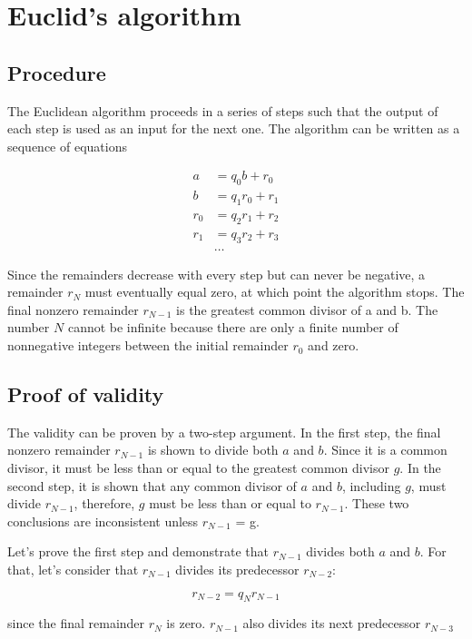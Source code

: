 \section*{Euclid's algorithm}

\subsection*{Procedure}

The Euclidean algorithm proceeds in a series of steps such that the output of each step is used as an input for the next one. The algorithm can be written as a sequence of equations

\begin{align*}
a &= q_0 b + r_0\\
b &= q_1 r_0 + r_1\\
r_0 &= q_2 r_1 + r_2\\
r_1 &= q_3 r_2 + r_3\\
&\dots
\end{align*}

Since the remainders decrease with every step but can never be negative, a remainder $r_N$ must eventually equal zero, at which point the algorithm stops. The final nonzero remainder $r_{N-1}$ is the greatest common divisor of a and b. The number $N$ cannot be infinite because there are only a finite number of nonnegative integers between the initial remainder $r_0$ and zero.

\subsection*{Proof of validity}

The validity can be proven by a two-step argument. In the first step, the final nonzero remainder $r_{N-1}$ is shown to divide both $a$ and $b$. Since it is a common divisor, it must be less than or equal to the greatest common divisor $g$. In the second step, it is shown that any common divisor of $a$ and $b$, including $g$, must divide $r_{N-1}$, therefore, $g$ must be less than or equal to $r_{N-1}$. These two conclusions are inconsistent unless $r_{N-1}$ = g.

Let's prove the first step and demonstrate that $r_{N-1}$ divides both $a$ and $b$. For that, let's consider that $r_{N-1}$ divides its predecessor $r_{N-2}$:

\[
r_{N-2} = q_N r_{N-1}
\]

since the final remainder $r_N$ is zero. $r_{N-1}$ also divides its next predecessor $r_{N-3}$


